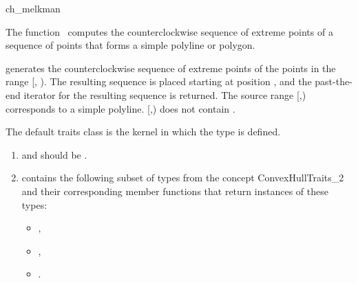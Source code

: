 

\begin{ccRefFunction}{ch_melkman}  %

\ccDefinition
  
The function \ccRefName\ computes the counterclockwise sequence of
extreme points of a sequence of points that forms a simple polyline or polygon.


            {generates the counterclockwise sequence of extreme points
            of the points in the range [, ). 
            The resulting sequence is placed starting at
            position , and the past-the-end iterator for
            the resulting sequence is returned.
            \ccPrecond %
            The source range [,) corresponds 
            to a simple polyline. 
            [,) does not contain }.

The default traits class  is the kernel in which the
type  is defined.


\begin{enumerate}
   \item    {} and 
            should be .
   \item    {} contains the following subset of types from
            the concept ConvexHullTraits\_2 and their corresponding member
            functions that return instances of these types:
            \begin{itemize}
                \item {},
                \item {}, 
                \item {}.
            \end{itemize}
\end{enumerate}


\end{ccRefFunction}
